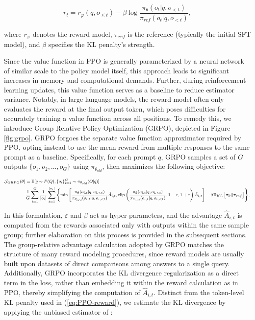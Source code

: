 \begin{equation}
    r_{t} = r_\varphi(q, o_{\le t}) - \beta \log\frac{\pi_{\theta}(o_{t}|q, o_{<t})}{\pi_{ref}(o_{t}|q, o_{<t})},
\label{eq:PPO-reward}
\end{equation}

where $r_\varphi$ denotes the reward model, $\pi_{ref}$ is the reference (typically the initial SFT model), and $\beta$ specifies the KL penalty's strength.

Since the value function in PPO is generally parameterized by a neural network of similar scale to the policy model itself, this approach leads to significant increases in memory and computational demands. Further, during reinforcement learning updates, this value function serves as a baseline to reduce estimator variance. Notably, in large language models, the reward model often only evaluates the reward at the final output token, which poses difficulties for accurately training a value function across all positions. To remedy this, we introduce Group Relative Policy Optimization (GRPO), depicted in Figure \ref{fig:grpo}. GRPO forgoes the separate value function approximator required by PPO, opting instead to use the mean reward from multiple responses to the same prompt as a baseline. Specifically, for each prompt $q$, GRPO samples a set of $G$ outputs $\{o_1, o_2, \ldots, o_G\}$ using $\pi_{\theta_{old}}$, then maximizes the following objective:

\begin{equation}
\footnotesize
\begin{split}
    \mathcal{J}_{GRPO}(\theta) &= \mathbb{E}{[q \sim P(Q), \{o_i\}_{i=1}^G \sim \pi_{\theta_{old}}(O|q)]}  \\
    & \frac{1}{G}\sum_{i=1}^G\frac{1}{|o_i|} \sum_{t=1}^{|o_i|} \left\{ \min \left[ \frac{\pi_\theta(o_{i,t} | q, o_{i,<t})}{\pi_{\theta_{old}}(o_{i,t} | q, o_{i,<t})} \hat{A}_{i,t}, \text{clip} \left( \frac{\pi_\theta(o_{i,t} | q, o_{i,<t})}{\pi_{\theta_{old}}(o_{i,t} | q, o_{i,<t})}, 1 - \varepsilon, 1 + \varepsilon \right)  \hat{A}_{i,t} \right] - \beta \mathbb{D}_{KL}\left[\pi_{\theta} || \pi_{ref}\right]\right\} ,
\end{split}
\label{eq:GRPO-obj}
\end{equation}

In this formulation, $\varepsilon$ and $\beta$ act as hyper-parameters, and the advantage $\hat{A}_{i,t}$ is computed from the rewards associated only with outputs within the same sample group; further elaboration on this process is provided in the subsequent sections. The group-relative advantage calculation adopted by GRPO matches the structure of many reward modeling procedures, since reward models are usually built upon datasets of direct comparisons among answers to a single query. Additionally, GRPO incorporates the KL divergence regularization as a direct term in the loss, rather than embedding it within the reward calculation as in PPO, thereby simplifying the computation of $\hat{A}_{i,t}$. Distinct from the token-level KL penalty used in (\ref{eq:PPO-reward}), we estimate the KL divergence by applying the unbiased estimator of \citep{kl_approx}:

